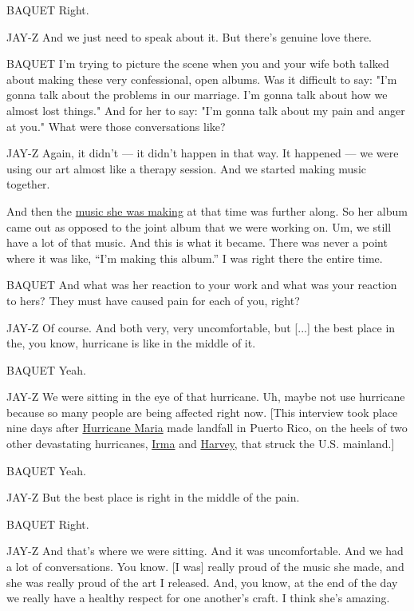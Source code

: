BAQUET Right.

JAY-Z And we just need to speak about it. But there's genuine love
there.

BAQUET I'm trying to picture the scene when you and your wife both
talked about making these very confessional, open albums. Was it
difficult to say: "I'm gonna talk about the problems in our marriage.
I'm gonna talk about how we almost lost things." And for her to say:
"I'm gonna talk about my pain and anger at you." What were those
conversations like?

JAY-Z Again, it didn't --- it didn't happen in that way. It happened ---
we were using our art almost like a therapy session. And we started
making music together.

And then the
\href{https://www.nytimes3xbfgragh.onion/2016/04/25/arts/music/beyonce-unearths-pain-and-lets-it-flow-in-lemonade.html}{music
she was making} at that time was further along. So her album came out as
opposed to the joint album that we were working on. Um, we still have a
lot of that music. And this is what it became. There was never a point
where it was like, ``I'm making this album.'' I was right there the
entire time.

BAQUET And what was her reaction to your work and what was your reaction
to hers? They must have caused pain for each of you, right?

JAY-Z Of course. And both very, very uncomfortable, but {[}...{]} the
best place in the, you know, hurricane is like in the middle of it.

BAQUET Yeah.

JAY-Z We were sitting in the eye of that hurricane. Uh, maybe not use
hurricane because so many people are being affected right now. {[}This
interview took place nine days after
\href{https://www.nytimes3xbfgragh.onion/2017/09/21/us/hurricane-maria-puerto-rico.html}{Hurricane
Maria} made landfall in Puerto Rico, on the heels of two other
devastating hurricanes,
\href{https://www.nytimes3xbfgragh.onion/2017/09/07/us/irma-florida-coverage.html}{Irma}
and
\href{https://www.nytimes3xbfgragh.onion/2017/08/28/us/hurricane-harvey-texas.html}{Harvey},
that struck the U.S. mainland.{]}

BAQUET Yeah.

JAY-Z But the best place is right in the middle of the pain.

BAQUET Right.

JAY-Z And that's where we were sitting. And it was uncomfortable. And we
had a lot of conversations. You know. {[}I was{]} really proud of the
music she made, and she was really proud of the art I released. And, you
know, at the end of the day we really have a healthy respect for one
another's craft. I think she's amazing.

